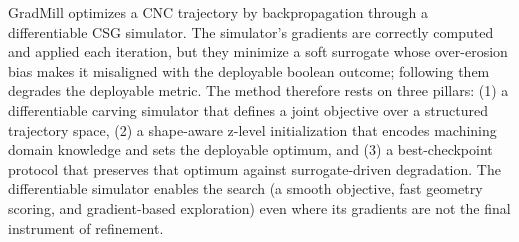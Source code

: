 GradMill optimizes a CNC trajectory by backpropagation through a differentiable
CSG simulator. The simulator's gradients are correctly computed and applied each
iteration, but they minimize a soft surrogate whose over-erosion bias makes it
misaligned with the deployable boolean outcome; following them degrades the
deployable metric. The method therefore rests on three pillars: (1) a
differentiable carving simulator that defines a joint objective over a
structured trajectory space, (2) a shape-aware z-level initialization that
encodes machining domain knowledge and sets the deployable optimum, and (3) a
best-checkpoint protocol that preserves that optimum against surrogate-driven
degradation. The differentiable simulator enables the search (a smooth
objective, fast geometry scoring, and gradient-based exploration) even where its
gradients are not the final instrument of refinement.
